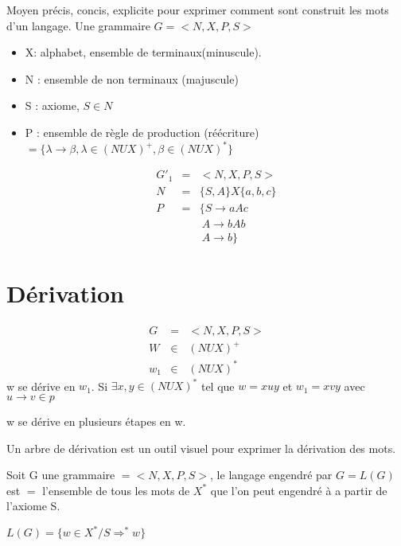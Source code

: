 \documentclass[12pt,a4paper,openany]{book}
\begin{document}
		\begin{definition}
			Moyen précis, concis, explicite pour exprimer comment sont construit les mots d'un langage. Une grammaire $G=<N, X, P, S>$\\
			\begin{itemize}
				\item X: alphabet, ensemble de terminaux(minuscule).
				\item N : ensemble de non terminaux (majuscule)
				\item S : axiome, $S\in N$
				\item P : ensemble de règle de production (réécriture) $=\{\lambda \rightarrow \beta, \lambda \in(NUX)^+, \beta\in(NUX)^*\}$
					\begin{exemple}
						\begin{eqnarray*}
							G'_1 &=&  <N,X,P,S>\\
							N &=&  \{S,A\} X\{a,b,c\}\\
							P&=& \{S \rightarrow aAc\\
							&&\ A \rightarrow bAb\\
							&&\ A \rightarrow b\}
						\end{eqnarray*}
					\end{exemple}
			\end{itemize}
		\end{definition}
		\section{Dérivation}
			\begin{eqnarray*}
				G &=&  <N,X,P,S>\\
				W &\in& (NUX)^+\\
				w_1&\in& (NUX)^* 
			\end{eqnarray*}
			w se dérive en $w_1$. Si $\exists x, y \in (NUX)^*$ tel que $w=xuy$ et $w_1=xvy$ avec $u\rightarrow v \in p$

			w se dérive en plusieurs étapes en w.
			\begin{definition}
				Un arbre de dérivation est un outil visuel pour exprimer la dérivation des mots.
			\end{definition}
			Soit G une grammaire $= <N,X,P,S>$, le langage engendré par $G=L(G)$ est $=$ l'ensemble de tous les mots de $X^*$ que l'on peut engendré à
			a partir de l'axiome S.

			$L(G) = \{w \in X^*/S\Rightarrow^* w\}$
\end{document}
